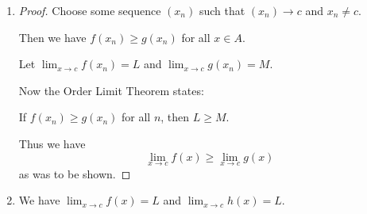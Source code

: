 \documentclass[12pt,letterpaper]{article}
\begin{document}
\begin{enumerate}[label=Exercise 4.2.\arabic*]
\begin{enumerate}
        \item
          Let $f : A \to R$.

          We say that $\lim_{x \to \infty} f(x) = \infty$ provided that,
          for all arbitrarily large $\epsilon$,
          there exists an arbitrarily large $\delta$
          such that whenever $x > \delta$ (and $x \in A$) it follows that $f(x) > \epsilon$.

          An example of such a limit is

          \[
            \lim_{x \to \infty} x = \infty
          \]

          \begin{proof}
            We have $f(x) = x$.

            Given an arbitrarily large $\epsilon$,
            we want to find an arbitrarily large $\delta$ such that

            \[
              x > \delta \implies x > \epsilon
            \].

            So, choose $\delta = \epsilon$.

            Then we have
            \[
              x > \delta \implies x > \epsilon
            \]
            as was to be shown.

          \end{proof}

      \end{enumerate}

    \item

      \begin{proof}

        Choose some sequence $(x_n)$ such that $(x_n) \to c$ and $x_n \ne c$.

        Then we have $f(x_n) \ge g(x_n)$ for all $x \in A$.

        Let $\lim_{x \to c} f(x_n) = L$ and $\lim_{x \to c} g(x_n) = M$.

        Now the Order Limit Theorem states:

        If $f(x_n) \ge g(x_n)$ for all $n$, then $L \ge M$.

        Thus we have
        \[
          \lim_{x \to c} f(x) \ge \lim_{x \to c} g(x)
        \]
        as was to be shown.
      \end{proof}

    \item

        We have $\lim_{x \to c} f(x) = L$ and $\lim_{x \to c} h(x) = L$.


\end{enumerate}
\end{document}
